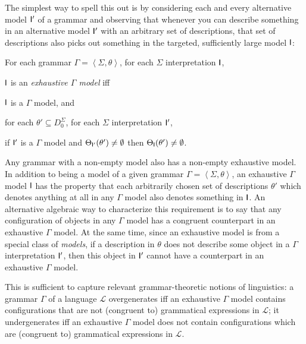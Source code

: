 \documentclass[output=paper
 	        ,biblatex
                ,babelshorthands
                ,newtxmath
                ,draftmode
                ,colorlinks, citecolor=brown
]{langscibook}
\begin{document}
{The simplest way to spell this out is by considering each and every
alternative model $\mathsf{I}'$ of a grammar and observing that whenever
you can describe something in an alternative model $\mathsf{I}'$ with an
arbitrary set of descriptions, that set of descriptions also picks out
something in the targeted, sufficiently large model $\mathsf{I}$:

\begin{mydef}\label{def-exhaustive-models}
For each grammar $\Gamma = \left< \Sigma, \theta \right>$,
for each $\Sigma$ interpretation $\mathsf{I}$,

$\mathsf{I}$ is an \emph{exhaustive $\Gamma$ model} iff

$\mathsf{I}$ is a $\Gamma$ model, and

for each \(\theta' \subseteq D_0^{\Sigma}\),
for each $\Sigma$ interpretation $\mathsf{I}'$,

if $\mathsf{I}'$ is a $\Gamma$ model and \(\Theta_{\mathsf{I}'}(\theta') \not= \emptyset\)
then \(\Theta_{\mathsf{I}}(\theta') \not= \emptyset\).
\end{mydef}

Any grammar with a non-empty model also has a non-empty exhaustive
mod\-el.
In addition to being a model of a given grammar $\Gamma = \left<
\Sigma, \theta \right>$, an exhaustive $\Gamma$ model $\mathsf{I}$ has the
property that each arbitrarily chosen set of descriptions $\theta'$
which denotes anything at all in any $\Gamma$ model also denotes
something in $\mathsf{I}$. An alternative algebraic way to characterize
this requirement is to say that any configuration of objects in any
$\Gamma$ model has a congruent counterpart in an exhaustive $\Gamma$
model. At the same time, since an exhaustive model is from a special class
of \emph{models}, if a description in $\theta$ does not describe some object in
a $\Gamma$ interpretation $\mathsf{I}'$, then this object in $\mathsf{I}'$ cannot
have a counterpart in an exhaustive $\Gamma$ model.

This is sufficient to capture relevant grammar-theoretic notions of
linguistics: a grammar $\Gamma$ of a language $\mathcal{L}$
overgenerates iff an exhaustive $\Gamma$ model contains configurations
that are not (congruent to) grammatical expressions in $\mathcal{L}$;
it undergenerates iff an exhaustive $\Gamma$ model does not contain
configurations which are (congruent to) grammatical expressions in
$\mathcal{L}$.




}
\end{document}
